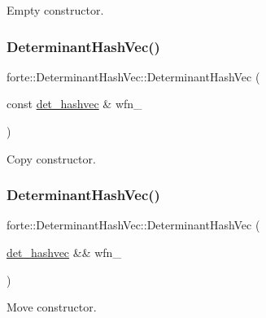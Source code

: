 Empty constructor. 

\mbox{\label{classforte_1_1_determinant_hash_vec_a3cd276dee3ee8a023104f1dc0224e941}} 
\subsubsection{\texorpdfstring{Determinant\+Hash\+Vec()}{DeterminantHashVec()}\hspace{0.1cm}{\footnotesize\ttfamily [5/6]}}
{\footnotesize\ttfamily forte\+::\+Determinant\+Hash\+Vec\+::\+Determinant\+Hash\+Vec (\begin{DoxyParamCaption}\item[{const \mbox{\hyperlink{namespaceforte_aee00ff2f656f0aa613d3f9f1ba01cad5}{det\+\_\+hashvec}} \&}]{wfn\+\_\+ }\end{DoxyParamCaption})}



Copy constructor. 

\mbox{\label{classforte_1_1_determinant_hash_vec_adda0ea8d50023e6b89493b3cd294ee10}} 
\subsubsection{\texorpdfstring{Determinant\+Hash\+Vec()}{DeterminantHashVec()}\hspace{0.1cm}{\footnotesize\ttfamily [6/6]}}
{\footnotesize\ttfamily forte\+::\+Determinant\+Hash\+Vec\+::\+Determinant\+Hash\+Vec (\begin{DoxyParamCaption}\item[{\mbox{\hyperlink{namespaceforte_aee00ff2f656f0aa613d3f9f1ba01cad5}{det\+\_\+hashvec}} \&\&}]{wfn\+\_\+ }\end{DoxyParamCaption})}



Move constructor. 



